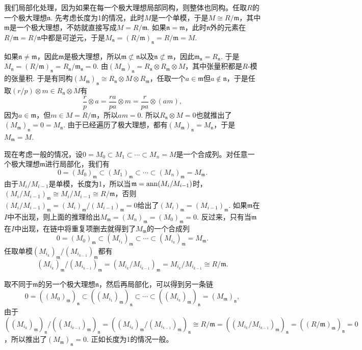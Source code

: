 \proof
	我们局部化处理，因为如果在每一个极大理想局部同构，则整体也同构。任取$R$的一个极大理想$\mathfrak{n}$. 先考虑长度为1的情况，此时$M$是一个单模，于是$M\cong R/\mathfrak{m}$，其中$\mathfrak{m}$是一个极大理想，不妨就直接写成$M=R/\mathfrak{m}$. 如果$\mathfrak{n}=\mathfrak{m}$，此时$\mathfrak{n}$外的元素在$R/\mathfrak{m}=R/\mathfrak{n}$中都是可逆元，于是$M_{\mathfrak{n}}=(R/\mathfrak{m})_{\mathfrak{n}}=R/\mathfrak{m}=M$. 

	如果$\mathfrak{n}\neq \mathfrak{m}$，因此$\mathfrak{m}$是极大理想，所以$\mathfrak{m}\not\subset \mathfrak{n}$以及$\mathfrak{n}\not\subset \mathfrak{m}$，因此$\mathfrak{m}_\mathfrak{n}=R_\mathfrak{n}$. 于是$M_\mathfrak{n}=(R/\mathfrak{m})_\mathfrak{n}=R_\mathfrak{n}/\mathfrak{m}_\mathfrak{n}=0$. 由$(M_\mathfrak{m})_\mathfrak{n}=R_\mathfrak{n}\otimes R_\mathfrak{m} \otimes M$，其中张量积都是$R$-模的张量积. 于是有同构$(M_\mathfrak{m})_\mathfrak{n}\cong R_\mathfrak{n}\otimes M\otimes R_\mathfrak{m}$，任取一个$a\in \mathfrak{m}$但$a\not\in \mathfrak{n}$，于是任取$(r/p)\otimes m \in R_\mathfrak{n}\otimes M$有
	\[
		\frac{r}{p}\otimes a=\frac{ra}{pa}\otimes m =\frac{r}{pa}\otimes (am),
	\]
	因为$a\in \mathfrak{m}$，但$m\in M=R/\mathfrak{m}$，所以$am=0$. 所以$R_\mathfrak{n}\otimes M=0$也就推出了$(M_\mathfrak{m})_\mathfrak{n}=0=M_\mathfrak{n}$. 由于已经遍历了极大理想，都有$(M_\mathfrak{m})_\mathfrak{n}=M_\mathfrak{n}$，于是$M_\mathfrak{m}=M$.

	现在考虑一般的情况，设$0=M_0\subset M_1\subset \cdots\subset M_n=M$是一个合成列。对任意一个极大理想$\mathfrak{m}$进行局部化，我们有
	\[
	0=(M_0)_\mathfrak{m}\subset (M_1)_\mathfrak{m}\subset \cdots\subset (M_n)_\mathfrak{m}=M_\mathfrak{m}.
	\]
	由于$M_i/M_{i-1}$是单模，长度为1，所以当$\mathfrak{m}=\operatorname{ann}(M_i/M_{i-1})$时，$(M_i/M_{i-1})_\mathfrak{m}\cong M_i/M_{i-1}\cong R/\mathfrak{m}$，否则$(M_i/M_{i-1})_{\mathfrak{m}}=(M_i)_{\mathfrak{m}}/(M_{i-1})_{\mathfrak{m}}=0$给出了$(M_i)_{\mathfrak{m}}=(M_{i-1})_{\mathfrak{m}}$. 如果$\mathfrak{m}$在$I$中不出现，则上面的推理给出$M_\mathfrak{m}=(M_n)_\mathfrak{m}=(M_0)_\mathfrak{m}=0$. 反过来，只有当$\mathfrak{m}$在$I$中出现，在链中将重复项删去就得到了$M_\mathfrak{m}$的一个合成列
	\[
	0=(M_0)_\mathfrak{m}\subset (M_{i_1})_\mathfrak{m}\subset \cdots\subset (M_{i_k})_\mathfrak{m}=M_\mathfrak{m}.
	\]
	任取单模$(M_{i_k})_\mathfrak{m}/(M_{i_{k-1}})_\mathfrak{m}$都有
	\[
	(M_{i_k})_\mathfrak{m}/(M_{i_{k-1}})_\mathfrak{m}=(M_{i_k}/M_{i_{k-1}})_\mathfrak{m}=M_{i_k}/M_{i_{k-1}}\cong R/\mathfrak{m}.
	\]

	取不同于$\mathfrak{m}$的另一个极大理想$\mathfrak{n}$，然后再局部化，可以得到另一条链
	\[
	0=((M_0)_\mathfrak{m})_\mathfrak{n}\subset ((M_{i_1})_\mathfrak{m})_\mathfrak{n}\subset \cdots\subset ((M_{i_k})_\mathfrak{m})_\mathfrak{n}=(M_\mathfrak{m})_\mathfrak{n},
	\]
	由于$((M_{i_k})_\mathfrak{m})_\mathfrak{n}/((M_{i_{k-1}})_\mathfrak{m})_\mathfrak{n}=((M_{i_k})_\mathfrak{m}/(M_{i_{k-1}})_\mathfrak{m})_{\mathfrak{n}}\cong R/\mathfrak{m}=((M_{i_k}/M_{i_{k-1}})_\mathfrak{m})_\mathfrak{n}=((R/\mathfrak{m})_{\mathfrak{m}})_\mathfrak{n}=0$，所以推出了$(M_\mathfrak{m})_\mathfrak{n}=0$. 正如长度为1的情况一般。

